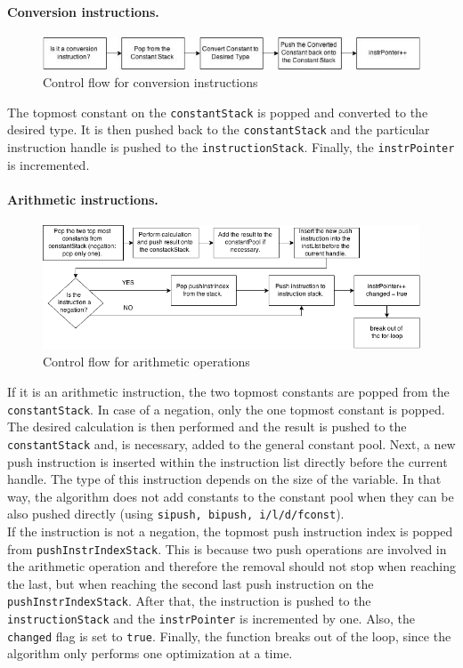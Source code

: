 \paragraph{Conversion instructions.}
\begin{figure}[h!]
\centering
\includegraphics[scale=0.6]{figures/conversion}
\caption{Control flow for conversion instructions}
\end{figure}

The topmost constant on the \texttt{constantStack} is popped and converted to the desired type. It is then pushed back to the \texttt{constantStack} and the particular instruction handle is pushed to the \texttt{instructionStack}. Finally, the \texttt{instrPointer} is incremented. 

\paragraph{Arithmetic instructions.}
\begin{figure}[h!]
\includegraphics[scale=0.6]{figures/arithmetic}
\caption{Control flow for arithmetic operations}
\end{figure}

If it is an arithmetic instruction, the two topmost constants are popped from the \texttt{constantStack}. In case of a negation, only the one topmost constant is popped. The desired calculation is then performed and the result is pushed to the \texttt{constantStack} and, is necessary, added to the general constant pool. Next, a new push instruction is inserted within the instruction list directly before the current handle. The type of this instruction depends on the size of the variable. In that way, the algorithm does not add constants to the constant pool when they can be also pushed directly (using \texttt{sipush, bipush, i/l/d/fconst}).\\
If the instruction is not a negation, the topmost push instruction index is popped from \texttt{pushInstrIndexStack}. This is because two push operations are involved in the arithmetic operation and therefore the removal should not stop when reaching the last, but when reaching the second last push instruction on the \texttt{pushInstrIndexStack}. After that, the instruction is pushed to the \texttt{instructionStack} and the \texttt{instrPointer} is incremented by one. Also, the \texttt{changed} flag is set to \texttt{true}. Finally, the function breaks out of the loop, since the algorithm only performs one optimization at a time.

